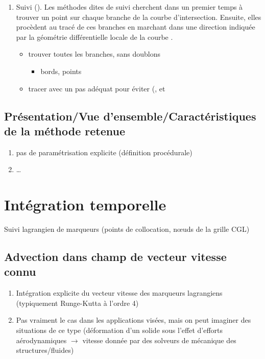 \begin{enumerate}
	\item Suivi ().
	Les méthodes dites de suivi cherchent dans un premier temps à trouver un point sur chaque branche de la courbe d'intersection. 
	Ensuite, elles procèdent au tracé de ces branches en marchant dans une direction indiquée par la géométrie différentielle locale de la courbe . 
	\begin{itemize}
		\item trouver toutes les branches, sans doublons
		\begin{itemize}
			\item bords, points 
		\end{itemize}
		\item tracer avec un pas adéquat pour éviter  (,  et 
	\end{itemize}
\end{enumerate}
%
\subsection{Présentation/Vue d'ensemble/Caractéristiques de la méthode retenue}
\begin{enumerate}
	\item pas de paramétrisation explicite (définition procédurale)
	\item \ldots
\end{enumerate}



\section{Intégration temporelle}
Suivi lagrangien de marqueurs (points de collocation, n\oe uds de la grille CGL)

\subsection{Advection dans champ de vecteur vitesse connu}
\begin{enumerate}
	\item Intégration explicite du vecteur vitesse des marqueurs lagrangiens (typiquement Runge-Kutta à l'ordre 4)
	\item Pas vraiment le cas dans les applications visées, mais on peut imaginer des situations de ce type (\eg déformation d'un solide sous l'effet d'efforts aérodynamiques $\to$ vitesse donnée par des solveurs de mécanique des structures/fluides)
\end{enumerate}



